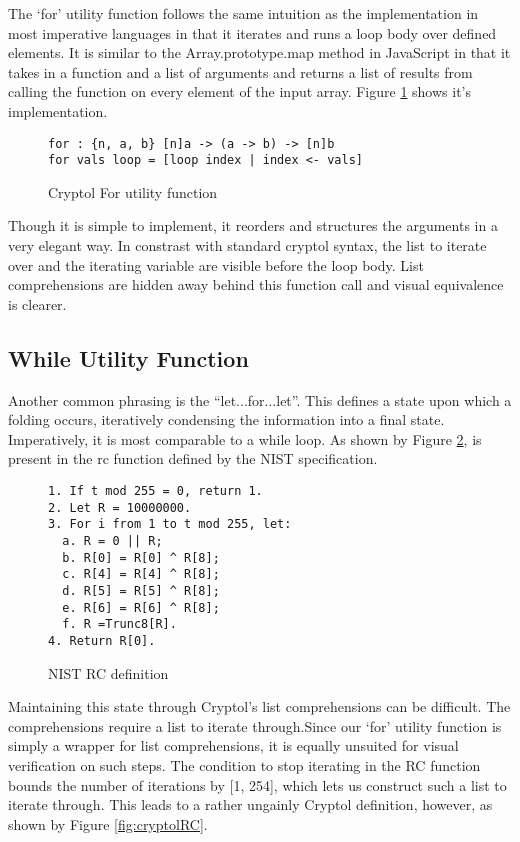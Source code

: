 The ‘for’ utility function follows the same intuition as the implementation in most 
imperative languages in that it iterates and runs a loop body over defined elements. 
It is similar to the Array.prototype.map method in JavaScript in that it takes in a 
function and a list of arguments and returns a list of results from calling the function 
on every element of the input array. Figure \ref{fig:cryptolFor} shows it's implementation.

\begin{figure}[h]
  \centering
\begin{lstlisting}[language=Cryptol]
for : {n, a, b} [n]a -> (a -> b) -> [n]b
for vals loop = [loop index | index <- vals]
\end{lstlisting}
\caption{Cryptol For utility function}
\label{fig:cryptolFor}
\end{figure}

Though it is simple to implement, it reorders and structures the arguments in a very elegant way.
In constrast with standard cryptol syntax, the list to iterate over and the iterating 
variable are visible before the loop body. List comprehensions are hidden away behind this 
function call and visual equivalence is clearer.

\subsection{While Utility Function}
Another common phrasing is the “let...for...let”. This defines a state upon which a folding 
occurs, iteratively condensing the information into a final state. Imperatively, it is most 
comparable to a while loop. As shown by Figure \ref{fig:nistRC}, is present in the rc function 
defined by the NIST specification.

\begin{figure}[h]
  \centering
\begin{lstlisting}[basewidth = {.5em}]
1. If t mod 255 = 0, return 1.
2. Let R = 10000000.
3. For i from 1 to t mod 255, let:
  a. R = 0 || R;
  b. R[0] = R[0] ^ R[8];
  c. R[4] = R[4] ^ R[8];
  d. R[5] = R[5] ^ R[8];
  e. R[6] = R[6] ^ R[8];
  f. R =Trunc8[R].
4. Return R[0].
\end{lstlisting}
\caption{NIST RC definition}
\label{fig:nistRC}
\end{figure}

Maintaining this state through Cryptol's list comprehensions can be difficult.
The comprehensions require a list to iterate through.Since our ‘for’ utility 
function is simply a wrapper for list comprehensions, it is equally unsuited for 
visual verification on such steps. The condition to stop iterating in the RC function
bounds the number of iterations by [1, 254], which lets us construct such a list to 
iterate through. This leads to a rather ungainly Cryptol definition, however, as 
shown by Figure \ref{fig:cryptolRC}.

